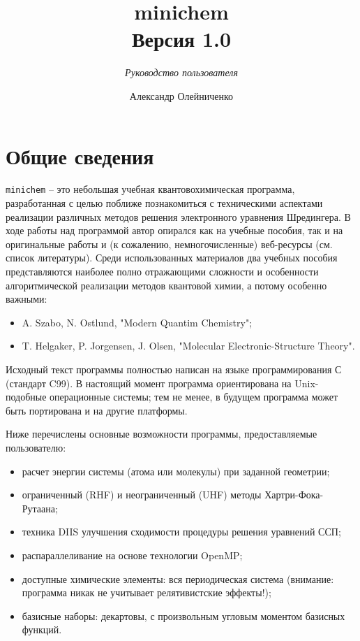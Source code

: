 \documentclass[a4paper, 12pt]{article}
\title{{\bf minichem} \\ \bigskip \normalsize Версия 1.0 }
\author{Александр Олейниченко}
\subtitle{\textit{Руководство пользователя}}
\begin{document}
\maketitle

\tableofcontents

\section{Общие сведения}

\texttt{minichem} -- это небольшая учебная квантовохимическая программа, разработанная с целью поближе познакомиться с техническими аспектами реализации различных методов решения электронного уравнения Шредингера. В ходе работы над программой автор опирался как на учебные пособия, так и на оригинальные работы и (к сожалению, немногочисленные) веб-ресурсы (см. список литературы). Среди использованных материалов два учебных пособия представляются наиболее полно отражающими сложности и особенности алгоритмической реализации методов квантовой химии, а потому особенно важными:

\begin{itemize}
\item A. Szabo, N. Ostlund, "Modern Quantim Chemistry";
\item T. Helgaker, P. Jorgensen, J. Olsen, "Molecular Electronic-Structure Theory".
\end{itemize}

Исходный текст программы полностью написан на языке программирования С (стандарт C99). В настоящий момент программа ориентирована на Unix-подобные операционные системы; тем не менее, в будущем программа может быть портирована и на другие платформы.

Ниже перечислены основные возможности программы, предоставляемые пользователю:

\begin{itemize}
\item расчет энергии системы (атома или молекулы) при заданной геометрии;
\item ограниченный (RHF) и неограниченный (UHF) методы Хартри-Фока-Рутаана;
\item техника DIIS улучшения сходимости процедуры решения уравнений ССП;
\item распараллеливание на основе технологии OpenMP;
\item доступные химические элементы: вся периодическая система (внимание: программа никак не учитывает релятивистские эффекты!);
\item базисные наборы: декартовы, с произвольным угловым моментом базисных функций.
\end{itemize}
\end{document}
